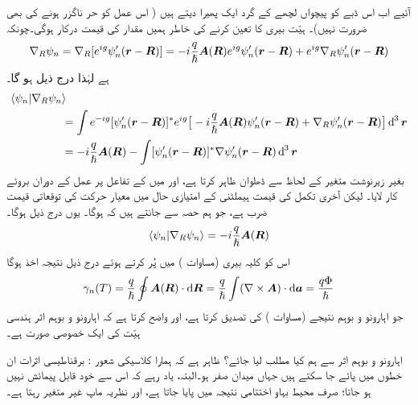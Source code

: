  آئیے اب اس ڈبے کو پیچواں لچھے کے گرد ایک پھیرا دیتے ہیں ( اس عمل کو حر ناگزر ہونے کی بھی ضرورت نہیں)۔ ہیّت بیری کا تعین کرنے کی خاطر ہمیں
 مقدار  کی قیمت درکار ہوگی۔چونکہ 
\begin{align*}
\nabla_R \psi_n = \nabla_R [e^{i g} \psi'_n ({{\boldsymbol{r}}} - {{\boldsymbol{R}}})] = -i \frac{q}{\hslash} {{\boldsymbol{A}}} ({{\boldsymbol{R}}}) e^{i g} \psi'_n ({{\boldsymbol{r}}} - {{\boldsymbol{R}}}) + e^{i g} \nabla_R \psi'_n ({{\boldsymbol{r}}} - {{\boldsymbol{R}}})
\end{align*}
ہے لہٰذا درج ذیل ہو گا۔ 
\begin{align}
\langle \psi_n | \nabla_R \psi_n &\rangle \nonumber\\
&= \int e^{- i g} [\psi'_n (\kvec{r} - \kvec{R})]^{*} e^{i g} \big [ - i \frac{q}{\hslash} \kvec{A} (\kvec{R}) \psi'_n (\kvec{r} - \kvec{R}) + \nabla_R \psi'_n (\kvec{r} - \kvec{R}) \big ] \dif^{\,3} \kvec{r} \nonumber\\
&= - i \frac{q}{\hslash} \kvec{A} (\kvec{R}) - \int [\psi'_n (\kvec{r} - \kvec{R})]^{*} \nabla \psi'_n (\kvec{r} - \kvec{R}) \dif^{\,3} \kvec{r}
\end{align}
بغیر زیرنوشت  متغیر  کے لحاظ سے ڈھلوان ظاہر کرتا ہے، اور میں  کے تفاعل پر عمل کے
 دوران  بروئے کار لایا۔ لیکن آخری تکمل کی قیمت ہیملٹنی  کے امتیازی حال میں معیار حرکت کی توقعاتی قیمت
 ضرب  ہے، جو ہم حصہ  سے جانتے ہیں کہ  ہوگا۔ یوں درج ذیل ہوگا۔
\begin{align}
\langle \psi_n | \nabla_R \psi_n \rangle = - i \frac{q}{\hslash} {{\boldsymbol{A}}} ({{\boldsymbol{R}}})
\end{align}
اس کو کلیہ بیری (مساوات ) میں پُر کرتے ہوئے درج ذیل نتیجہ اخذ ہوگا 
\begin{align}
\gamma_n (T) = \frac{q}{\hslash} \oint \kvec{A} (\kvec{R}) \cdot \dif \kvec{R} = \frac{q}{\hslash} \int (\nabla \times \kvec{A}) \cdot \dif \kvec{a} = \frac{q \Phi}{\hslash}
\end{align}
جو اہارونو و بوہم نتیجے (مساوات ) کی تصدیق کرتا ہے، اور واضح کرتا ہے کہ اہارونو و بوہم اثر ہندسی ہیّت کی ایک خصوصی صورت ہے۔

اہارونو و بوہم اثر سے ہم کیا مطلب لیا جائے؟ ظاہر ہے کہ ہمارا کلاسیکی شعور : برقناطیسی اثرات ان خطوں میں پائے جا سکتے ہیں جہاں میدان صفر ہو۔البتہ، یاد رہے کہ اس سے  خود قابل پیمائش نہیں ہو جاتا؛ صرف محیط بہاو اختتامی نتیجہ میں پایا جاتا ہے، اور نظریہ ماپ غیر متغیر رہتا ہے۔

